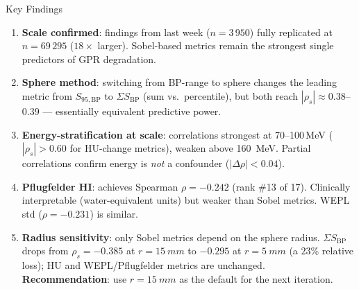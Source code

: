 \documentclass[aspectratio=169, 10pt]{beamer}
\begin{document}
\begin{frame}{Key Findings}
  \begin{enumerate}
    \item \textbf{Scale confirmed}: findings from last week
          ($n = 3\,950$) fully replicated at $n = 69\,295$ ($18\times$
          larger). Sobel-based metrics remain the strongest
          single predictors of GPR degradation.

    \vspace{4pt}
    \item \textbf{Sphere method}: switching from BP-range to sphere
          changes the leading metric from $S_{95,\text{BP}}$ to
          $\Sigma S_{\text{BP}}$ (sum vs.\ percentile), but both
          reach $|\rho_s| \approx 0.38$--$0.39$ — essentially
          equivalent predictive power.

    \vspace{4pt}
    \item \textbf{Energy-stratification at scale}:
          correlations strongest at 70--100\,MeV ($|\rho_s| > 0.60$
          for HU-change metrics), weaken above \SI{160}{MeV}.
          Partial correlations confirm energy is \emph{not} a confounder
          ($|\Delta\rho| < 0.04$).

    \vspace{4pt}
    \item \textbf{Pflugfelder HI}: achieves Spearman $\rho = -0.242$
          (rank \#13 of 17).  Clinically interpretable (water-equivalent
          units) but weaker than Sobel metrics.
          WEPL std ($\rho = -0.231$) is similar.

    \vspace{4pt}
    \item \textbf{Radius sensitivity}: only Sobel metrics depend on
          the sphere radius. $\Sigma S_{\text{BP}}$ drops from
          $\rho_s = -0.385$ at $r = \SI{15}{mm}$ to $-0.295$ at
          $r = \SI{5}{mm}$ (a $23\%$ relative loss); HU and
          WEPL/Pflugfelder metrics are unchanged.
          \textbf{Recommendation}: use $r = \SI{15}{mm}$ as the default
          for the next iteration.
  \end{enumerate}
\end{frame}
\end{document}

